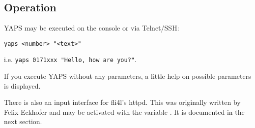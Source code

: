 \subsection {Operation}

YAPS may be executed on the console or via Telnet/SSH:
\begin{small}
\begin{example}
\begin{verbatim}
yaps <number> "<text>"
\end{verbatim}
\end{example}
\end{small}

i.e. \verb|yaps 0171xxx "Hello, how are you?"|.

If you execute YAPS without any parameters, a little help on possible
parameters is displayed.

There is also an input interface for fli4l's httpd. This was originally
written by Felix Eckhofer and may be activated with the variable
. It is documented in the next section.